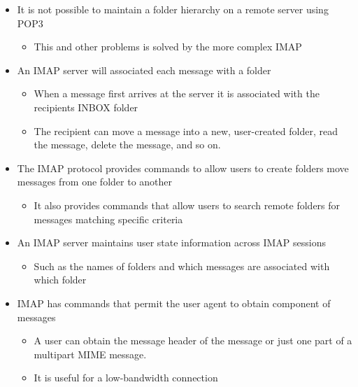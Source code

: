 \documentclass[11pt]{article}
\providecommand{\tightlist}{%
      \setlength{\itemsep}{0pt}\setlength{\parskip}{0pt}}
\begin{document}
\begin{itemize}
\tightlist
\item
  It is not possible to maintain a folder hierarchy on a remote server
  using POP3

  \begin{itemize}
  \tightlist
  \item
    This and other problems is solved by the more complex IMAP
  \end{itemize}
\item
  An IMAP server will associated each message with a folder

  \begin{itemize}
  \tightlist
  \item
    When a message first arrives at the server it is associated with the
    recipients INBOX folder
  \item
    The recipient can move a message into a new, user-created folder,
    read the message, delete the message, and so on.
  \end{itemize}
\item
  The IMAP protocol provides commands to allow users to create folders
  move messages from one folder to another

  \begin{itemize}
  \tightlist
  \item
    It also provides commands that allow users to search remote folders
    for messages matching specific criteria
  \end{itemize}
\item
  An IMAP server maintains user state information across IMAP sessions

  \begin{itemize}
  \tightlist
  \item
    Such as the names of folders and which messages are associated with
    which folder
  \end{itemize}
\item
  IMAP has commands that permit the user agent to obtain component of
  messages

  \begin{itemize}
  \tightlist
  \item
    A user can obtain the message header of the message or just one part
    of a multipart MIME message.
  \item
    It is useful for a low-bandwidth connection
  \end{itemize}
\end{itemize}
\end{document}

